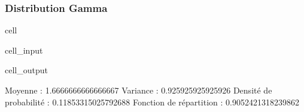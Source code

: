 \documentclass[letterpaper,10pt,english]{jupyterBook}
\begin{document}
\subsubsection{Distribution Gamma}
\label{\detokenize{elemstats:distribution-gamma}}
\begin{sphinxuseclass}{cell}\begin{sphinxVerbatimInput}

\begin{sphinxuseclass}{cell_input}
\begin{sphinxVerbatim}[commandchars=\\\{\}]
   

   
   
   

        
 
 
      
     
\end{sphinxVerbatim}

\end{sphinxuseclass}\end{sphinxVerbatimInput}
\begin{sphinxVerbatimOutput}

\begin{sphinxuseclass}{cell_output}
\begin{sphinxVerbatim}[commandchars=\\\{\}]
Moyenne :  1.6666666666666667
Variance :  0.925925925925926
Densité de probabilité :  0.11853315025792688
Fonction de répartition :  0.9052421318239862
\end{sphinxVerbatim}

\end{sphinxuseclass}\end{sphinxVerbatimOutput}

\end{sphinxuseclass}
\end{document}
